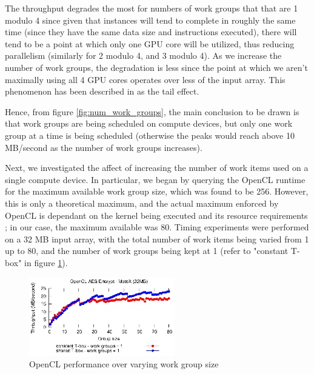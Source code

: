 \documentclass[conference,10pt]{IEEEtran}
\begin{document}
The throughput degrades the most for numbers of work groups that that are 1 modulo 4 since given that 
instances will tend to complete in roughly the same time (since they have the same data size and 
instructions executed), there will tend to be a point at which only one GPU core will be utilized, thus 
reducing parallelism (similarly for 2 modulo 4, and 3 modulo 4). As we increase the number of work groups, 
the degradation is less since the point at which we aren't maximally using all 4 GPU cores operates over 
less of the input array.  This phenomenon has been described in \cite{gpu_opt} as the tail effect.

Hence, from figure \ref{fig:num_work_groups}, the main conclusion to be drawn is that work groups are being 
scheduled on compute devices, but only one work group at a time is being scheduled (otherwise the peaks 
would reach above 10 MB/second as the number of work groups increases).

Next, we investigated the affect of increasing the number of work items used on a single compute device.  
In particular, we began by querying the OpenCL runtime for the maximum available work group size, which was 
found to be 256.  However, this is only a theoretical maximum, and the actual maximum enforced by OpenCL is 
dependant on the kernel being executed and its resource requirements \cite{opencl_guide}; in our case, the 
maximum available was 80.  Timing experiments were performed on a 32 MB input array, with the total number 
of work items being varied from 1 up to 80, and the number of work groups being kept at 1 (refer to 
"constant T-box" in figure \ref{fig:work_group_size}).

\begin{figure}[!t]
\centering
\includegraphics[width=2.5in]{../final/motox/4.2/opencl_aes_group_size.constant_tbox.shared_tbox.eps}
\caption{OpenCL performance over varying work group size}
\label{fig:work_group_size}
\end{figure}
\end{document}
